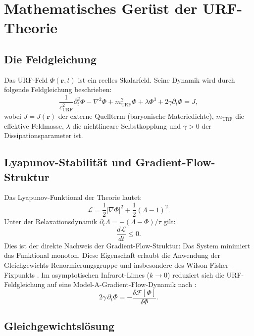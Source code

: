 \documentclass[12pt,a4paper]{article}
\theoremstyle{definition}
\begin{document}
\section{Mathematisches Gerüst der URF-Theorie}
\label{sec:feldtheorie}

\subsection{Die Feldgleichung}

Das URF-Feld $\Phi(\mathbf{r}, t)$ ist ein reelles Skalarfeld.
Seine Dynamik wird durch folgende Feldgleichung beschrieben:
\begin{equation}
\boxed{\frac{1}{c_{\mathrm{URF}}^2}\partial_t^2\Phi - \nabla^2\Phi
+ m_{\mathrm{URF}}^2\Phi + \lambda\Phi^3 + 2\gamma\partial_t\Phi = J,}
\label{eq:feldgleichung}
\end{equation}
wobei $J = J(\mathbf{r})$ der externe Quellterm (baryonische Materiedichte),
$m_{\mathrm{URF}}$ die effektive Feldmasse, $\lambda$ die nichtlineare
Selbstkopplung und $\gamma > 0$ der Dissipationsparameter ist.

\subsection{Lyapunov-Stabilität und Gradient-Flow-Struktur}

Das Lyapunov-Funktional der Theorie lautet:
\begin{equation}
\mathcal{L} = \frac{1}{2}|\nabla\Phi|^2 + \frac{1}{2}(\Lambda - 1)^2.
\end{equation}
Unter der Relaxationsdynamik $\partial_t\Lambda = -(\Lambda - \Phi)/\tau$ gilt:
\begin{equation}
\frac{d\mathcal{L}}{dt} \leq 0.
\end{equation}
Dies ist der direkte Nachweis der Gradient-Flow-Struktur: Das System
minimiert das Funktional monoton. Diese Eigenschaft erlaubt die Anwendung
der Gleichgewichts-Renormierungsgruppe und insbesondere des
Wilson-Fisher-Fixpunkts \cite{Wilson1972}. Im asymptotischen Infrarot-Limes
($k \to 0$) reduziert sich die URF-Feldgleichung auf eine
Model-A-Gradient-Flow-Dynamik nach \cite{Hohenberg1977}:
\begin{equation}
2\gamma\,\partial_t\Phi = -\frac{\delta\mathcal{F}[\Phi]}{\delta\Phi}.
\end{equation}

\subsection{Gleichgewichtslösung}
\end{document}
